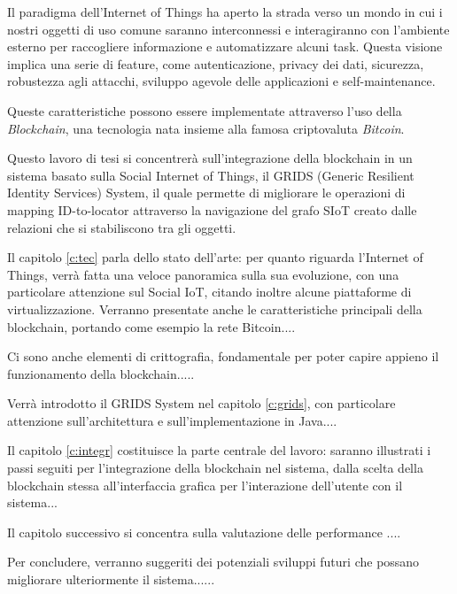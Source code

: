 Il paradigma dell'Internet of Things ha aperto la strada verso un mondo in cui i nostri oggetti di uso comune saranno interconnessi e interagiranno con l'ambiente esterno per raccogliere informazione e automatizzare alcuni task. Questa visione implica una serie di feature, come autenticazione, privacy dei dati, sicurezza, robustezza agli attacchi, sviluppo agevole delle applicazioni e self-maintenance.\cite{Fernandez-Carames2018}

Queste caratteristiche possono essere implementate attraverso l'uso della \textit{Blockchain}, una tecnologia nata insieme alla famosa criptovaluta \textit{Bitcoin}. 



Questo lavoro di tesi si concentrerà sull'integrazione della blockchain in un sistema basato sulla Social Internet of Things, il GRIDS (Generic Resilient Identity Services) System, il quale permette di migliorare le operazioni di mapping ID-to-locator attraverso la navigazione del grafo SIoT creato dalle relazioni che si stabiliscono tra gli oggetti.

Il capitolo \ref{c:tec} parla dello stato dell'arte: per quanto riguarda l'Internet of Things, verrà fatta una veloce panoramica sulla sua evoluzione, con una particolare attenzione sul Social IoT, citando inoltre alcune piattaforme di virtualizzazione. Verranno presentate anche le caratteristiche principali della blockchain, portando come esempio la rete Bitcoin.... 

Ci sono anche elementi di crittografia, fondamentale per poter capire appieno il funzionamento della blockchain.....

Verrà introdotto il GRIDS System nel capitolo \ref{c:grids}, con particolare attenzione sull'architettura e sull'implementazione in Java....

Il capitolo \ref{c:integr} costituisce la parte centrale del lavoro: saranno illustrati i passi seguiti per l'integrazione della blockchain nel sistema, dalla scelta della blockchain stessa all'interfaccia grafica per l'interazione dell'utente con il sistema...

Il capitolo successivo si concentra sulla valutazione delle performance ....

Per concludere, verranno suggeriti dei potenziali sviluppi futuri che possano migliorare ulteriormente il sistema......
